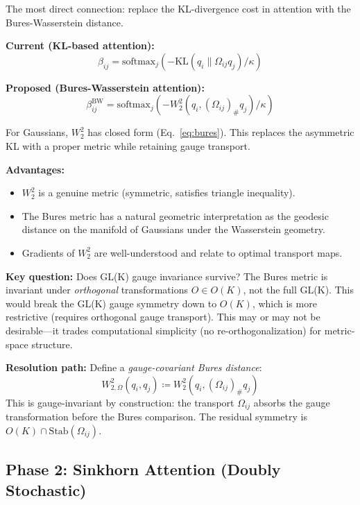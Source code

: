 \documentclass[11pt]{article}
\newcommand{\KL}{\mathrm{KL}}
\begin{document}
The most direct connection: replace the KL-divergence cost in attention with the Bures-Wasserstein distance.

\textbf{Current (KL-based attention):}
\begin{equation}
\beta_{ij} = \text{softmax}_j\!\left(-\KL(q_i \| \Omega_{ij}q_j)/\kappa\right)
\end{equation}

\textbf{Proposed (Bures-Wasserstein attention):}
\begin{equation}
\beta_{ij}^{\text{BW}} = \text{softmax}_j\!\left(-W_2^2(q_i, (\Omega_{ij})_\#q_j)/\kappa\right)
\end{equation}

For Gaussians, $W_2^2$ has closed form (Eq.~\ref{eq:bures}). This replaces the asymmetric KL with a proper metric while retaining gauge transport.

\textbf{Advantages:}
\begin{itemize}
    \item $W_2^2$ is a genuine metric (symmetric, satisfies triangle inequality).
    \item The Bures metric has a natural geometric interpretation as the geodesic distance on the manifold of Gaussians under the Wasserstein geometry.
    \item Gradients of $W_2^2$ are well-understood and relate to optimal transport maps.
\end{itemize}

\textbf{Key question:} Does GL(K) gauge invariance survive? The Bures metric is invariant under \emph{orthogonal} transformations $O \in O(K)$, not the full GL(K). This would break the GL(K) gauge symmetry down to $O(K)$, which is more restrictive (requires orthogonal gauge transport). This may or may not be desirable---it trades computational simplicity (no re-orthogonalization) for metric-space structure.

\textbf{Resolution path:} Define a \emph{gauge-covariant Bures distance}:
\begin{equation}
W_{2,\Omega}^2(q_i, q_j) \coloneqq W_2^2(q_i, (\Omega_{ij})_\#q_j)
\end{equation}
This is gauge-invariant by construction: the transport $\Omega_{ij}$ absorbs the gauge transformation before the Bures comparison. The residual symmetry is $O(K) \cap \text{Stab}(\Omega_{ij})$.

\subsection{Phase 2: Sinkhorn Attention (Doubly Stochastic)}
\end{document}
